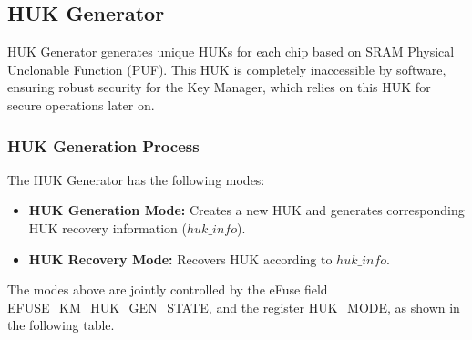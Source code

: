 \documentclass[main\_\_EN.tex]{subfiles}
\begin{document}
\subsection{HUK Generator}

HUK Generator generates unique HUKs for each chip based on SRAM Physical Unclonable Function (PUF). This HUK is completely inaccessible by software, ensuring robust security for the Key Manager, which relies on this HUK for secure operations later on.

\subsubsection{HUK Generation Process}

The HUK Generator has the following modes:
\begin{itemize}
    \item \textbf{HUK Generation Mode:} Creates a new HUK and generates corresponding HUK recovery information (\hyperref[para:hukinfo]{\begin{math}huk\_info\end{math}}).
    \item \textbf{HUK Recovery Mode:} Recovers HUK according to \hyperref[para:hukinfo]{\begin{math}huk\_info\end{math}}.
\end{itemize}

The modes above are jointly controlled by the eFuse field EFUSE\_KM\_HUK\_GEN\_STATE, and the register \hyperref[fielddesc:HUKMODE]{HUK\_MODE}, as shown in the following table.
\end{document}
